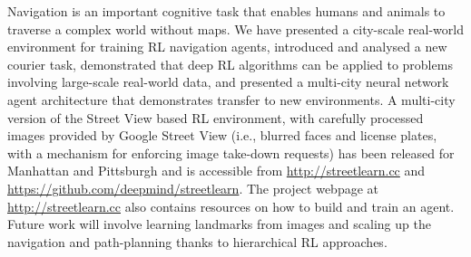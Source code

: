 Navigation is an important cognitive task that enables humans and animals to traverse a complex world without maps.
We have presented a city-scale real-world environment for training RL navigation agents, introduced and analysed a new courier task, demonstrated that deep RL algorithms can be applied to problems involving large-scale real-world data, and presented a multi-city neural network agent architecture that demonstrates transfer to new environments. 
A multi-city version of the Street View based RL environment, with carefully processed images provided by Google Street View (i.e., blurred faces and license plates, with a mechanism for enforcing image take-down requests) has been released for Manhattan and Pittsburgh and is accessible from \url{http://streetlearn.cc} and \url{https://github.com/deepmind/streetlearn}. The project webpage at \url{http://streetlearn.cc} also contains resources on how to build and train an agent.
Future work will involve learning landmarks from images and scaling up the navigation and path-planning thanks to hierarchical RL approaches.
